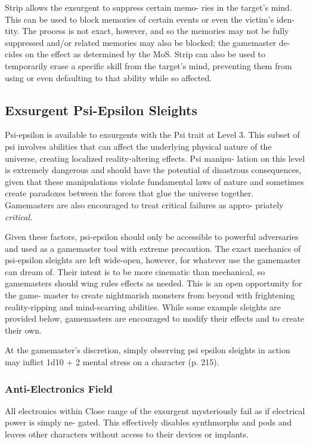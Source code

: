 Strip allows the exsurgent to suppress certain memo-
ries in the target's mind. This can be used to block 
memories of certain events or even the victim's iden-
tity. The process is not exact, however, and so the 
memories may not be fully suppressed and/or related 
memories may also be blocked; the gamemaster de-
cides on the effect as determined by the MoS. Strip can 
also be used to temporarily erase a specific skill from 
the target's mind, preventing them from using or even 
defaulting to that ability while so affected.

\subsection{Exsurgent Psi-Epsilon Sleights }

Psi-epsilon is available to exsurgents with the Psi trait 
at Level 3. This subset of psi involves abilities that can 
affect the underlying physical nature of the universe, 
creating localized reality-altering effects. Psi manipu-
lation on this level is extremely dangerous and should 
have the potential of disastrous consequences, given 
that these manipulations violate fundamental laws of 
nature and sometimes create paradoxes between the 
forces that glue the universe together. Gamemasters 
are also encouraged to treat critical failures as appro-
priately \textit{critical.}

Given these factors, psi-epsilon should only be 
accessible to powerful adversaries and used as a 
gamemaster tool with extreme precaution. The exact 
mechanics of psi-epsilon sleights are left wide-open, 
however, for whatever use the gamemaster can 
dream of. Their intent is to be more cinematic than 
mechanical, so gamemasters should wing rules effects 
as needed. This is an open opportunity for the game-
master to create nightmarish monsters from beyond 
with frightening reality-ripping and mind-scarring 
abilities. While some example sleights are provided 
below, gamemasters are encouraged to modify their 
effects and to create their own. 

At the gamemaster's discretion, simply observing psi 
epsilon sleights in action may inflict 1d10 + 2 mental 
stress on a character (p. 215).

\subsubsection{Anti-Electronics Field}

All electronics within Close range of the exsurgent 
mysteriously fail as if electrical power is simply ne-
gated. This effectively disables synthmorphs and pods 
and leaves other characters without access to their 
devices or implants.

